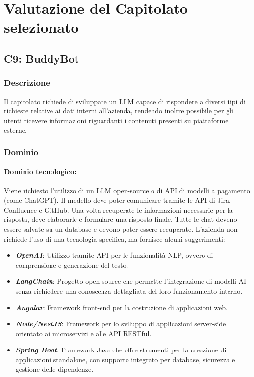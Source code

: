 \section{Valutazione del Capitolato selezionato}

\subsection{C9: BuddyBot}

\subsubsection{Descrizione}
Il capitolato richiede di sviluppare un LLM capace di rispondere
a diversi tipi di richieste relative ai dati interni all'azienda, 
rendendo inoltre possibile per gli utenti ricevere informazioni riguardanti 
i contenuti presenti su piattaforme esterne.

\subsubsection{Dominio}
\paragraph{Dominio tecnologico:}
Viene richiesto l'utilizzo di un LLM open-source o di API di modelli 
a pagamento (come ChatGPT). Il modello deve poter comunicare tramite le API di Jira, 
Confluence e GitHub. Una volta recuperate le informazioni necessarie per la risposta,
deve elaborarle e formulare una risposta finale. Tutte le chat devono essere
salvate su un database e devono poter essere recuperate. L'azienda non richiede
l'uso di una tecnologia specifica, ma fornisce alcuni suggerimenti:
\begin{itemize}
    \item \textit{\textbf{OpenAI}}: Utilizzo tramite API per le funzionalità NLP, ovvero di comprensione e generazione del testo.
    \item \textit{\textbf{LangChain}}: Progetto open-source che permette l'integrazione di modelli AI senza richiedere una conoscenza dettagliata del loro funzionamento interno.
    \item \textit{\textbf{Angular}}: Framework front-end per la costruzione di applicazioni web.
    \item \textit{\textbf{Node/NestJS}}: Framework per lo sviluppo di applicazioni server-side orientato ai microservizi e alle API RESTful.
    \item \textit{\textbf{Spring Boot}}: Framework Java che offre strumenti per la creazione di applicazioni standalone, con supporto integrato per database, sicurezza e gestione delle dipendenze.
\end{itemize}


